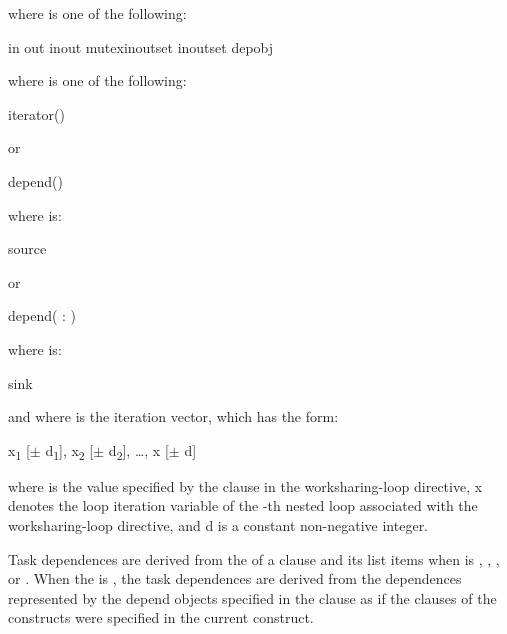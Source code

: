 where  is one of the following:
\begin{indentedcodelist}
in
out
inout
mutexinoutset
inoutset
depobj
\end{indentedcodelist}

where  is one of the following:
\begin{indentedcodelist}
iterator() 
\end{indentedcodelist}

or

\begin{ompSyntax}
depend()
\end{ompSyntax}

where  is:
\begin{indentedcodelist}
source
\end{indentedcodelist}

or

\begin{ompSyntax}
depend( : )
\end{ompSyntax}

where  is:
\begin{indentedcodelist}
sink
\end{indentedcodelist}

and where  is the iteration vector, which has the form:

x\textsubscript{1} [$\pm $ d\textsubscript{1}], x\textsubscript{2} [$\pm $ d\textsubscript{2}], \ldots, x\textsubscript{} [$\pm $ d\textsubscript{}]

where  is the value specified by the  clause in the 
worksharing-loop directive, x\textsubscript{} denotes the loop 
iteration variable of the -th nested loop associated with the 
worksharing-loop directive, and d\textsubscript{} is a constant 
non-negative integer.

\descr
Task dependences are derived from the  of a  
clause and its list items when  is , , 
,  or . When the  is 
, the task dependences are derived from the dependences represented 
by the depend objects specified in the  clause as if the  
clauses of the  constructs were specified in the current construct. 

